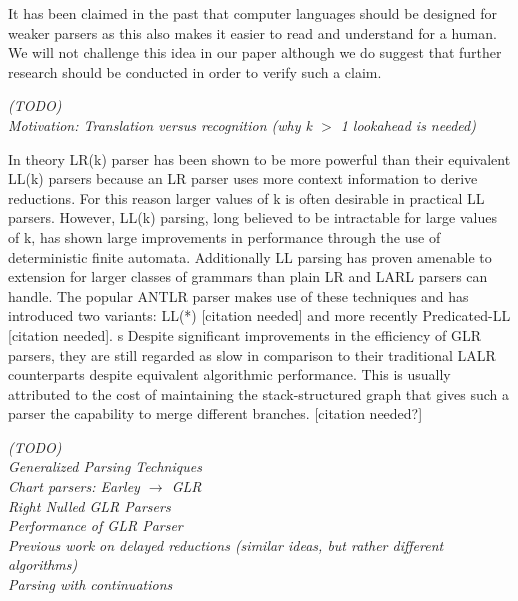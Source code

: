 \documentclass[a4paper,11pt]{article}
\begin{document}
It has been claimed in the past that computer languages should be designed for weaker parsers as this also makes it easier to read and understand for a human.
We will not challenge this idea in our paper although we do suggest that further research should be conducted in order to verify such a claim.

\emph{(TODO)\\ %
Motivation: Translation versus recognition (why k $>$ 1 lookahead is needed) \cite{Parr95lland}}


In theory LR(k) parser has been shown to be more powerful than their equivalent LL(k) parsers because an LR parser uses more context information to derive reductions.
For this reason larger values of k is often desirable in practical LL parsers.
However, LL(k) parsing, long believed to be intractable for large values of k, has shown large improvements in performance through the use of deterministic finite automata. 
Additionally LL parsing has proven amenable to extension for larger classes of grammars than plain LR and LARL parsers can handle.
The popular ANTLR parser makes use of these techniques and has introduced two variants: LL(*) [citation needed]\cite{} and more recently Predicated-LL \cite{} [citation needed].
s
Despite significant improvements in the efficiency of GLR parsers, they are still regarded as slow in comparison to their traditional LALR counterparts despite equivalent algorithmic performance.
This is usually attributed to the cost of maintaining the stack-structured graph that gives such a parser the capability to merge different branches. [citation needed?]




\emph{(TODO)\\ %
Generalized Parsing Techniques \cite{Thurston07}\\
Chart parsers: Earley $\rightarrow$ GLR \\
Right Nulled GLR Parsers \cite{1146810}\\
Performance of GLR Parser \cite{Mcpeak04elkhound:a}\\ %
Previous work on delayed reductions (similar ideas, but rather different algorithms) \cite{1287949, Marc80, 991520, 146993}\\
Parsing with continuations
}
\end{document}
